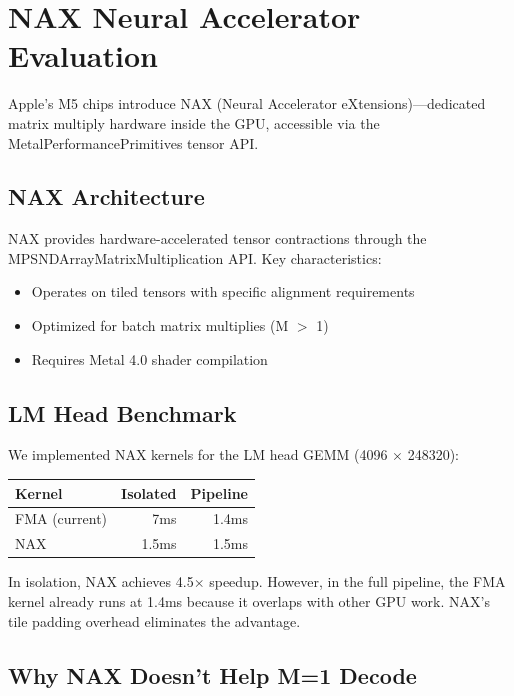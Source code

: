 \documentclass[11pt,twocolumn]{article}
\begin{document}
\section{NAX Neural Accelerator Evaluation}
\label{sec:nax}

Apple's M5 chips introduce NAX (Neural Accelerator eXtensions)---dedicated matrix multiply hardware inside the GPU, accessible via the MetalPerformancePrimitives tensor API.

\subsection{NAX Architecture}

NAX provides hardware-accelerated tensor contractions through the MPSNDArrayMatrixMultiplication API. Key characteristics:
\begin{itemize}
    \item Operates on tiled tensors with specific alignment requirements
    \item Optimized for batch matrix multiplies (M $>$ 1)
    \item Requires Metal 4.0 shader compilation
\end{itemize}

\subsection{LM Head Benchmark}

We implemented NAX kernels for the LM head GEMM (4096 $\times$ 248320):

\begin{center}
\begin{tabular}{lrr}
\toprule
\textbf{Kernel} & \textbf{Isolated} & \textbf{Pipeline} \\
\midrule
FMA (current) & 7ms & 1.4ms \\
NAX & 1.5ms & 1.5ms \\
\bottomrule
\end{tabular}
\end{center}

In isolation, NAX achieves 4.5$\times$ speedup. However, in the full pipeline, the FMA kernel already runs at 1.4ms because it overlaps with other GPU work. NAX's tile padding overhead eliminates the advantage.

\subsection{Why NAX Doesn't Help M=1 Decode}
\end{document}
